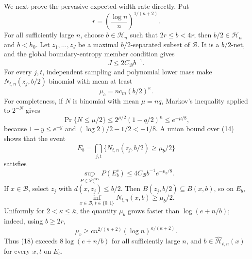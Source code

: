 We next prove the pervasive expected-width rate directly.  Put
\[
 r=\left(\frac{\log n}{n}\right)^{1/(\kappa+2)}.
\]
For all sufficiently large \(n\), choose \(b\in\mathcal H_n\) such that \(2r\le b<4r\); then \(b/2\in\mathcal H_n\) and \(b<h_0\).  Let \(z_1,\ldots,z_J\) be a maximal \(b/2\)-separated subset of \(\mathcal B\).  It is a \(b/2\)-net, and the global boundary-entropy member condition gives
\[
 J\le 2C_{\mathcal B}b^{-1}. \tag{14}
\]
For every \(j,t\), independent sampling and polynomial lower mass make \(N_{t,n}(z_j,b/2)\) binomial with mean at least
\[
 \mu_b=nc_m(b/2)^\kappa. \tag{15}
\]
For completeness, if \(N\) is binomial with mean \(\mu=nq\), Markov's inequality applied to \(2^{-N}\) gives
\[
 \Pr\{N\le\mu/2\}
 \le 2^{\mu/2}(1-q/2)^n
 \le e^{-\mu/8}, \tag{16}
\]
because \(1-y\le e^{-y}\) and \((\log2)/2-1/2<-1/8\).  A union bound over (14) shows that the event
\[
 E_b=\bigcap_{j,t}\{N_{t,n}(z_j,b/2)\ge\mu_b/2\}
\]
satisfies
\[
 \sup_{P\in\mathcal P_\kappa^{\mathrm{perv}}}P(E_b^c)
 \le 4C_{\mathcal B}b^{-1}e^{-\mu_b/8}. \tag{17}
\]
If \(x\in\mathcal B\), select \(z_j\) with \(d(x,z_j)\le b/2\).  Then \(B(z_j,b/2)\subseteq B(x,b)\), so on \(E_b\),
\[
 \inf_{x\in\mathcal B,\,t\in\{0,1\}}N_{t,n}(x,b)\ge\mu_b/2. \tag{18}
\]
Uniformly for \(2<\kappa\le\overline\kappa\), the quantity \(\mu_b\) grows faster than \(\log(e+n/b)\); indeed, using \(b\ge2r\),
\[
 \mu_b\ge c n^{2/(\kappa+2)}(\log n)^{\kappa/(\kappa+2)}. \tag{19}
\]
Thus (18) exceeds \(8\log(e+n/b)\) for all sufficiently large \(n\), and \(b\in\widehat{\mathcal H}_{t,n}(x)\) for every \(x,t\) on \(E_b\).

